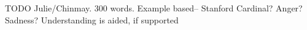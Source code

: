 TODO Julie/Chinmay.  300 words.
Example based-- Stanford Cardinal? Anger? Sadness?
Understanding is aided, if supported